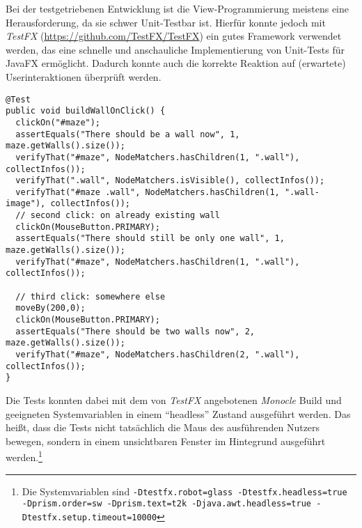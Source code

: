Bei der testgetriebenen Entwicklung ist die View-Programmierung meistens eine Herausforderung, da sie schwer Unit-Testbar ist. Hierfür konnte jedoch mit \emph{TestFX} (\url{https://github.com/TestFX/TestFX}) ein gutes Framework verwendet werden, das eine schnelle und anschauliche Implementierung von Unit-Tests für JavaFX ermöglicht. Dadurch konnte auch die korrekte Reaktion auf (erwartete) Userinteraktionen überprüft werden.
\begin{lstlisting}[caption={Beispielcode von TestFX. Das Setup wurde aus Platzgründen nicht aufgeführt, ist aber im Code in der Abstrakten Oberklasse aller ViewTests \class{AbstractViewTest} zu finden. TestFX ermöglicht die Simulation von Mausklicks (Zeile 3, 9 und 15), Bewegungen (Zeile 14) und ermöglicht Überprüfungen der Auswirkung (z.B Zeilen 5-7). Die Methode collectInfos() sammelt bei Fehlschlagen der Überprüfung bisherige Events und erstellt einen Screenshot der Situation für leichtere Problembehandlung.}, captionpos=b]
@Test
public void buildWallOnClick() {
  clickOn("#maze");
  assertEquals("There should be a wall now", 1, maze.getWalls().size());
  verifyThat("#maze", NodeMatchers.hasChildren(1, ".wall"), collectInfos());
  verifyThat(".wall", NodeMatchers.isVisible(), collectInfos());
  verifyThat("#maze .wall", NodeMatchers.hasChildren(1, ".wall-image"), collectInfos());
  // second click: on already existing wall
  clickOn(MouseButton.PRIMARY);
  assertEquals("There should still be only one wall", 1, maze.getWalls().size());
  verifyThat("#maze", NodeMatchers.hasChildren(1, ".wall"), collectInfos());

  // third click: somewhere else
  moveBy(200,0);
  clickOn(MouseButton.PRIMARY);
  assertEquals("There should be two walls now", 2, maze.getWalls().size());
  verifyThat("#maze", NodeMatchers.hasChildren(2, ".wall"), collectInfos());
}	
\end{lstlisting}
Die Tests konnten dabei mit dem von \emph{TestFX} angebotenen \emph{Monocle} Build und geeigneten Systemvariablen in einem \enquote{headless} Zustand ausgeführt werden. Das heißt, dass die Tests nicht tatsächlich die Maus des ausführenden Nutzers bewegen, sondern in einem unsichtbaren Fenster im Hintegrund ausgeführt werden.\footnote{Die Systemvariablen sind \texttt{-Dtestfx.robot=glass -Dtestfx.headless=true -Dprism.order=sw -Dprism.text=t2k -Djava.awt.headless=true -Dtestfx.setup.timeout=10000}}
